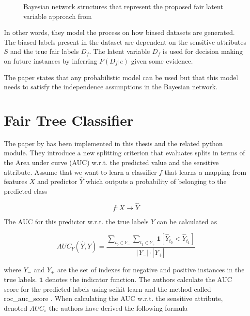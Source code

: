 \begin{figure}[h!]
    \centering
    \caption{Bayesian network structures that represent the proposed
fair latent variable approach from \cite{Choi:2021:AIII}}
    \label{fig:choinetwork}
\end{figure}

In other words, they model the process on how biased datasets are generated. The biased labels present in the dataset are dependent on the sensitive attributes $S$ and the true fair labels $D_f$. The latent variable $D_f$ is used for decision making on future instances by inferring $P(D_f|e)$ given some evidence.

The paper states that any probabilistic model can be used but that this model needs to satisfy the independence assumptions in the Bayesian network.

\section{Fair Tree Classifier}
\label{sec:fairtree}

The paper by \citet{Antonio:2021:arXiv} has been implemented in this thesis and the related python module. They introduce a new splitting criterion that evaluates splits in terms of the Area under curve (AUC) w.r.t. the predicted value and the sensitive attribute. Assume that we want to learn a classifier $f$ that learns a mapping from features $X$ and predictor $\hat{Y}$ which outputs a probability of belonging to the predicted class

$$
f: X \rightarrow \hat{Y}
$$

The AUC for this predictor w.r.t. the true labels $Y$ can be calculated as

\begin{equation*}
    AUC_Y(\hat{Y}, Y) =  \frac
    {
        \sum_{t_0 \in Y_{-}} \sum_{t_1 \in Y_{+}}  \textbf{1}[\hat{Y}_{t_0} < \hat{Y}_{t_1}]
    }
    {
        |Y_{-}| \cdot |Y_{+}|
    }
\end{equation*}

where $Y_-$ and $Y_+$ are the set of indexes for negative and positive instances in the true labels. $\textbf{1}$ denotes the indicator function. The authors calculate the AUC score for the predicted labels using scikit-learn \cite{Pedregosa:2011:JMLR} and the method called roc\_auc\_score \cite{Buitinck:2013:PKDD}. When calculating the AUC w.r.t. the sensitive attribute, denoted $AUC_s$ the authors have derived the following formula

